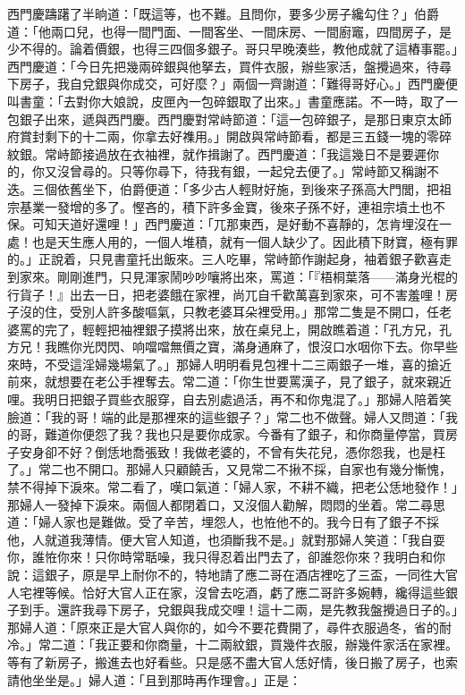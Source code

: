 西門慶躊躇了半晌道：「既這等，也不難。且問你，要多少房子纔勾住？」伯爵道：「他兩口兒，也得一間門面、一間客坐、一間床房、一間廚竈，四間房子，是少不得的。論着價銀，也得三四個多銀子。哥只早晚湊些，教他成就了這樁事罷。」西門慶道：「今日先把幾兩碎銀與他拏去，買件衣服，辦些家活，盤攪過來，待尋下房子，我自兌銀與你成交，可好麼？」兩個一齊謝道：「難得哥好心。」西門慶便叫書童：「去對你大娘說，皮匣內一包碎銀取了出來。」書童應諾。不一時，取了一包銀子出來，遞與西門慶。西門慶對常峙節道：「這一包碎銀子，是那日東京太師府賞封剩下的十二兩，你拿去好襍用。」開啟與常峙節看，都是三五錢一塊的零碎紋銀。常峙節接過放在衣袖裡，就作揖謝了。西門慶道：「我這幾日不是要遲你的，你又沒曾尋的。只等你尋下，待我有銀，一起兌去便了。」常峙節又稱謝不迭。{}三個依舊坐下，伯爵便道：「多少古人輕財好施，到後來子孫高大門閭，把祖宗基業一發增的多了。慳吝的，積下許多金寶，後來子孫不好，連祖宗墳土也不保。可知天道好還哩！」西門慶道：「兀那東西，是好動不喜靜的，怎肯埋沒在一處！也是天生應人用的，一個人堆積，就有一個人缺少了。因此積下財寶，極有罪的。」{}正說着，只見書童托出飯來。三人吃畢，常峙節作謝起身，袖着銀子歡喜走到家來。剛剛進門，只見渾家鬧吵吵嚷將出來，罵道：「『梧桐葉落——滿身光棍的行貨子！』出去一日，把老婆餓在家裡，尚兀自千歡萬喜到家來，可不害羞哩！房子沒的住，受別人許多酸嘔氣，只教老婆耳朵裡受用。」那常二隻是不開口，{}任老婆罵的完了，輕輕把袖裡銀子摸將出來，放在桌兒上，開啟瞧着道：「孔方兄，孔方兄！我瞧你光閃閃、响噹噹無價之寶，滿身通麻了，恨沒口水咽你下去。你早些來時，不受這淫婦幾場氣了。」{}那婦人明明看見包裡十二三兩銀子一堆，喜的搶近前來，就想要在老公手裡奪去。{}常二道：「你生世要罵漢子，見了銀子，就來親近哩。我明日把銀子買些衣服穿，自去別處過活，再不和你鬼混了。」那婦人陪着笑臉道：「我的哥！端的此是那裡來的這些銀子？」常二也不做聲。婦人又問道：「我的哥，難道你便怨了我？我也只是要你成家。今番有了銀子，和你商量停當，買房子安身卻不好？倒恁地喬張致！我做老婆的，不曾有失花兒，憑你怨我，也是枉了。」常二也不開口。那婦人只顧饒舌，又見常二不揪不採，自家也有幾分慚愧，禁不得掉下淚來。常二看了，嘆口氣道：「婦人家，不耕不織，把老公恁地發作！」那婦人一發掉下淚來。{}兩個人都閉着口，又沒個人勸解，悶悶的坐着。{}常二尋思道：「婦人家也是難做。受了辛苦，埋怨人，也恠他不的。我今日有了銀子不採他，人就道我薄情。{}便大官人知道，也須斷我不是。」就對那婦人笑道：「我自耍你，誰恠你來！只你時常聒噪，我只得忍着出門去了，卻誰怨你來？我明白和你說：這銀子，原是早上耐你不的，特地請了應二哥在酒店裡吃了三盃，一同徃大官人宅裡等候。恰好大官人正在家，沒曾去吃酒，虧了應二哥許多婉轉，纔得這些銀子到手。還許我尋下房子，兌銀與我成交哩！這十二兩，是先教我盤攪過日子的。」那婦人道：「原來正是大官人與你的，如今不要花費開了，尋件衣服過冬，省的耐冷。」常二道：「我正要和你商量，十二兩紋銀，買幾件衣服，辦幾件家活在家裡。等有了新房子，搬進去也好看些。只是感不盡大官人恁好情，{}後日搬了房子，也索請他坐坐是。」婦人道：「且到那時再作理會。」正是：


